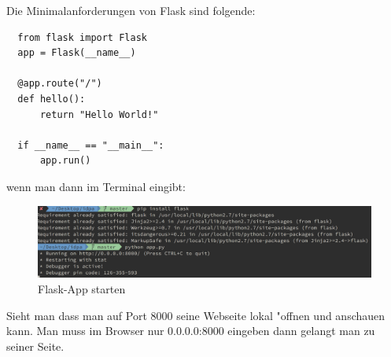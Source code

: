 \documentclass{article}
\begin{document}
Die Minimalanforderungen von Flask sind folgende:
\begin{lstlisting}
  from flask import Flask
  app = Flask(__name__)

  @app.route("/")
  def hello():
      return "Hello World!"

  if __name__ == "__main__":
      app.run()
\end{lstlisting}
wenn man dann im Terminal eingibt:

\begin{figure}[ht]
    \centering
    \includegraphics[width=1\linewidth]{python-app}
    \caption{Flask-App starten}
    \label{fig:sub1}
    \end{figure}

    Sieht man dass man auf Port 8000 seine Webseite lokal "offnen und anschauen kann.
    Man muss im Browser nur 0.0.0.0:8000 eingeben dann gelangt man zu seiner Seite.

    \cleardoublepage

%
\end{document}
